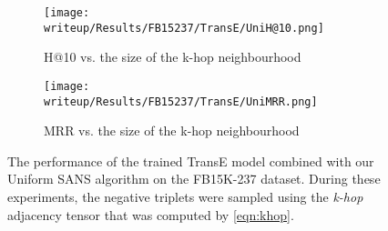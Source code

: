 \begin{figure}[!htbp]
    \centering %
\begin{subfigure}{0.33\textwidth}
  \texttt{[image: writeup/Results/FB15237/TransE/UniH@10.png]}
  \captionsetup{justification=centering}
  \caption{H@10 vs. the size of the k-hop neighbourhood}
  \label{fig:FB15237_TransE_UniH@10}
\end{subfigure}\hfil %
\begin{subfigure}{0.33\textwidth}
  \texttt{[image: writeup/Results/FB15237/TransE/UniMRR.png]}
  \captionsetup{justification=centering}
  \caption{MRR vs. the size of the k-hop neighbourhood}
  \label{fig:FB15237_TransE_H@3TURW}
\end{subfigure}\hfil %
\caption{The performance of the trained TransE model combined with our Uniform SANS algorithm on the FB15K-237 dataset. During these experiments, the negative triplets were sampled using the \emph{k-hop} adjacency tensor that was computed by \ref{eqn:khop}.}
\label{fig:FB15237_TransE_Uni}
\end{figure} 